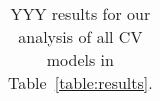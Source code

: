 \begin{table}[t]
\begin{center}
\begin{tabular}{|c|c|c|c|c|c|}
\hline
\end{tabular}
\vspace{-5mm}
\end{center}
\caption{YYY results for our analysis of all CV models in Table~\ref{table:results}. }
\label{table:RMSEresults}
\end{table}

